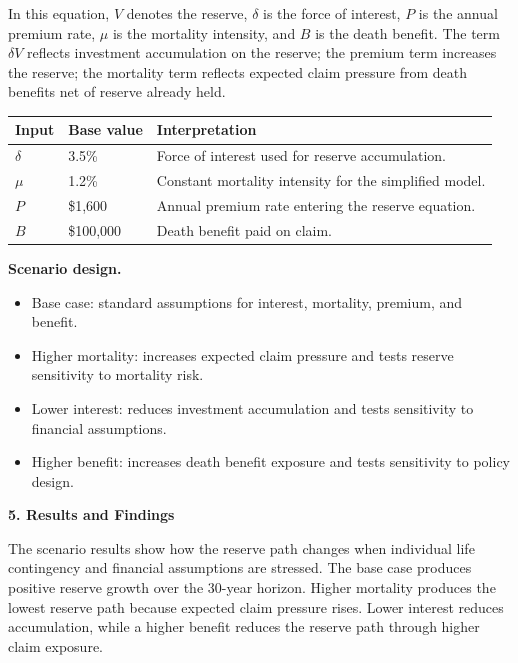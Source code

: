 \documentclass[11pt,letterpaper]{article}
\newcommand{\reportsection}[1]{%
  \vspace{5pt}
  \begin{center}
    {\large\bfseries #1}
  \end{center}
  \vspace{1pt}
}
\newcommand{\reportsubsection}[1]{%
  \vspace{5pt}
  {\normalsize\bfseries #1.}
}
\begin{document}
In this equation, $V$ denotes the reserve, $\delta$ is the force of interest, $P$ is the annual premium rate, $\mu$ is the mortality intensity, and $B$ is the death benefit. The term $\delta V$ reflects investment accumulation on the reserve; the premium term increases the reserve; the mortality term reflects expected claim pressure from death benefits net of reserve already held.

\begin{table}[H]
\centering
\small
{}
\begin{tabularx}{\textwidth}{p{1.1in} p{1.35in} Y}
\toprule
\textbf{Input} & \textbf{Base value} & \textbf{Interpretation} \\
\midrule
$\delta$ & 3.5\% & Force of interest used for reserve accumulation. \\
$\mu$ & 1.2\% & Constant mortality intensity for the simplified model. \\
$P$ & \$1,600 & Annual premium rate entering the reserve equation. \\
$B$ & \$100,000 & Death benefit paid on claim. \\
\bottomrule
\end{tabularx}
\end{table}

\reportsubsection{Scenario design}
\begin{itemize}[leftmargin=18pt,itemsep=2pt,topsep=3pt]
  \item Base case: standard assumptions for interest, mortality, premium, and benefit.
  \item Higher mortality: increases expected claim pressure and tests reserve sensitivity to mortality risk.
  \item Lower interest: reduces investment accumulation and tests sensitivity to financial assumptions.
  \item Higher benefit: increases death benefit exposure and tests sensitivity to policy design.
\end{itemize}

\newpage
\reportsection{5. Results and Findings}

The scenario results show how the reserve path changes when individual life contingency and financial assumptions are stressed. The base case produces positive reserve growth over the 30-year horizon. Higher mortality produces the lowest reserve path because expected claim pressure rises. Lower interest reduces accumulation, while a higher benefit reduces the reserve path through higher claim exposure.
\end{document}
